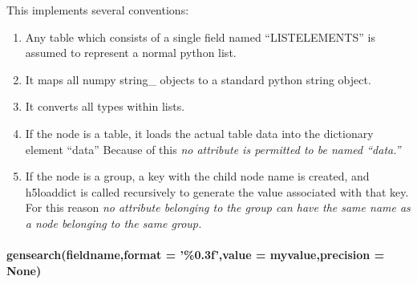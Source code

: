 This implements several conventions:
\begin{mykwargs}
    \begin{enumerate}
        \item Any table which consists of a single field
            named ``LISTELEMENTS'' is assumed to represent
            a normal python list.
        \item  It maps all numpy string\_ objects
            to a standard python string object.
        \item It converts all types within lists. 
        \item If the node is a table, it loads the actual
            table data into the dictionary element ``data''
            Because of this \textit{no attribute is permitted
            to be named ``data.''}
        \item If the node is a group, a key with the child node
            name is created, and h5loaddict is called recursively
            to generate the value associated with that key.
            For this reason \textit{no attribute belonging to the
            group can have the same name as a node belonging to the
            same group.}
    \end{enumerate}
\end{mykwargs}
\paragraph{gensearch(fieldname,format = '\%0.3f',value = myvalue,precision = None)}
